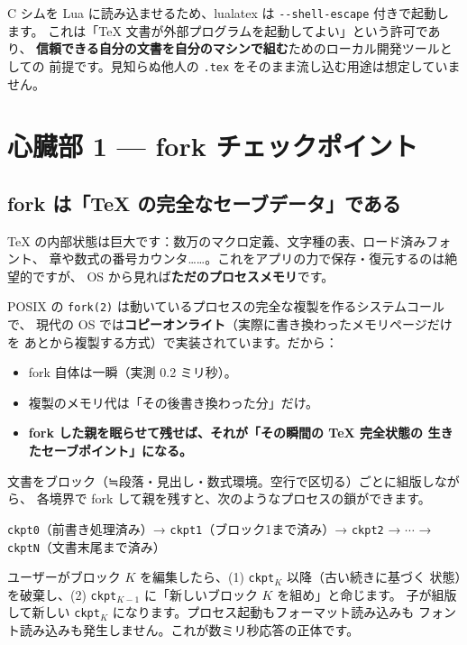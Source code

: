 \documentclass[11pt,a4paper]{ltjsarticle}
\newcommand{\code}[1]{\texttt{#1}}
\begin{document}
C シムを Lua に読み込ませるため、lualatex は \code{-{}-shell-escape} 付きで起動します。
これは「TeX 文書が外部プログラムを起動してよい」という許可であり、
\textbf{信頼できる自分の文書を自分のマシンで組む}ためのローカル開発ツールとしての
前提です。見知らぬ他人の \code{.tex} をそのまま流し込む用途は想定していません。

\section{心臓部 1 --- fork チェックポイント}
\label{sec:checkpoint}

\subsection{fork は「TeX の完全なセーブデータ」である}

TeX の内部状態は巨大です：数万のマクロ定義、文字種の表、ロード済みフォント、
章や数式の番号カウンタ……。これをアプリの力で保存・復元するのは絶望的ですが、
OS から見れば\textbf{ただのプロセスメモリ}です。

POSIX の \code{fork(2)} は動いているプロセスの完全な複製を作るシステムコールで、
現代の OS では\textbf{コピーオンライト}（実際に書き換わったメモリページだけを
あとから複製する方式）で実装されています。だから：

\begin{itemize}
\item fork 自体は一瞬（実測 0.2 ミリ秒）。
\item 複製のメモリ代は「その後書き換わった分」だけ。
\item \textbf{fork した親を眠らせて残せば、それが「その瞬間の TeX 完全状態の
  生きたセーブポイント」になる。}
\end{itemize}

文書をブロック（≒段落・見出し・数式環境。空行で区切る）ごとに組版しながら、
各境界で fork して親を残すと、次のようなプロセスの鎖ができます。

\begin{center}
\code{ckpt0}（前書き処理済み）→ \code{ckpt1}（ブロック1まで済み）→
\code{ckpt2} → $\cdots$ → \code{ckptN}（文書末尾まで済み）
\end{center}

ユーザーがブロック $K$ を編集したら、(1) \code{ckpt}$_K$ 以降（古い続きに基づく
状態）を破棄し、(2) \code{ckpt}$_{K-1}$ に「新しいブロック $K$ を組め」と命じます。
子が組版して新しい \code{ckpt}$_K$ になります。プロセス起動もフォーマット読み込みも
フォント読み込みも発生しません。これが数ミリ秒応答の正体です。
\end{document}
